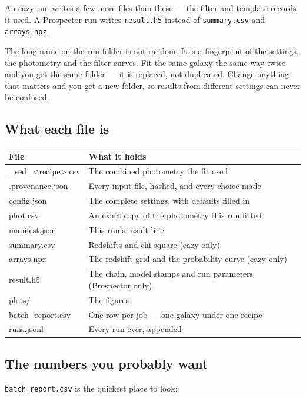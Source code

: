 \documentclass[11pt]{article}
\begin{document}
\noindent An eazy run writes a few more files than these --- the filter
and template records it used. A Prospector run writes
\texttt{result.h5} instead of \texttt{summary.csv} and
\texttt{arrays.npz}.

The long name on the run folder is not random. It is a fingerprint of the
settings, the photometry and the filter curves. Fit the same galaxy the
same way twice and you get the same folder --- it is replaced, not
duplicated. Change anything that matters and you get a new folder, so
results from different settings can never be confused.

\subsection{What each file is}

\begin{center}
\begin{tabular}{>{\ttfamily}l p{9.2cm}}
\toprule
\textbf{\normalfont File} & \textbf{What it holds} \\
\midrule
\_sed\_<recipe>.csv & The combined photometry the fit used \\
.provenance.json & Every input file, hashed, and every choice made \\
config.json & The complete settings, with defaults filled in \\
phot.csv & An exact copy of the photometry this run fitted \\
manifest.json & This run's result line \\
summary.csv & Redshifts and chi-square (eazy only) \\
arrays.npz & The redshift grid and the probability curve (eazy only) \\
result.h5 & The chain, model stamps and run parameters (Prospector only) \\
plots/ & The figures \\
batch\_report.csv & One row per job --- one galaxy under one recipe \\
runs.jsonl & Every run ever, appended \\
\bottomrule
\end{tabular}
\end{center}

\subsection{The numbers you probably want}

\texttt{batch\_report.csv} is the quickest place to look:
\end{document}
